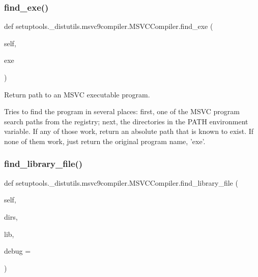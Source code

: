 \mbox{\label{classsetuptools_1_1__distutils_1_1msvc9compiler_1_1MSVCCompiler_a9c2e065ffb5074a673ff120f080a1e90}} 
\subsubsection{\texorpdfstring{find\+\_\+exe()}{find\_exe()}}
{\footnotesize\ttfamily def setuptools.\+\_\+distutils.\+msvc9compiler.\+M\+S\+V\+C\+Compiler.\+find\+\_\+exe (\begin{DoxyParamCaption}\item[{}]{self,  }\item[{}]{exe }\end{DoxyParamCaption})}

\begin{DoxyVerb}Return path to an MSVC executable program.

Tries to find the program in several places: first, one of the
MSVC program search paths from the registry; next, the directories
in the PATH environment variable.  If any of those work, return an
absolute path that is known to exist.  If none of them work, just
return the original program name, 'exe'.
\end{DoxyVerb}
 \mbox{\label{classsetuptools_1_1__distutils_1_1msvc9compiler_1_1MSVCCompiler_acc6a203d0116c8e1a8a22ebdb3a6c489}} 
\subsubsection{\texorpdfstring{find\+\_\+library\+\_\+file()}{find\_library\_file()}}
{\footnotesize\ttfamily def setuptools.\+\_\+distutils.\+msvc9compiler.\+M\+S\+V\+C\+Compiler.\+find\+\_\+library\+\_\+file (\begin{DoxyParamCaption}\item[{}]{self,  }\item[{}]{dirs,  }\item[{}]{lib,  }\item[{}]{debug = {} }\end{DoxyParamCaption})}

